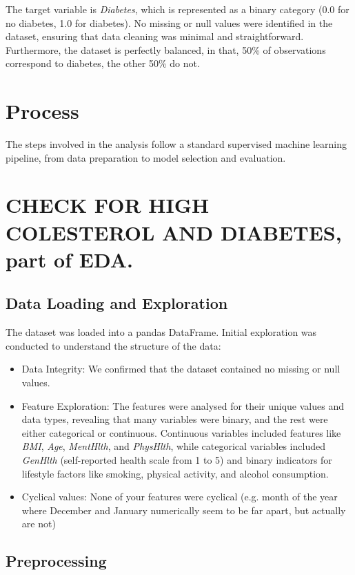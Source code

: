 \documentclass[a4paper,12pt]{article}
\begin{document}
The target variable is \textit{Diabetes}, which is represented as a binary category 
(0.0 for no diabetes, 1.0 for diabetes). No missing or null values were identified in the dataset, 
ensuring that data cleaning was minimal and straightforward. Furthermore, the dataset is perfectly 
balanced, in that, 50\% of observations correspond to diabetes, the other 50\% do not.


\section{Process}
The steps involved in the analysis follow a standard supervised machine learning pipeline, 
from data preparation to model selection and evaluation.

\section{CHECK FOR HIGH COLESTEROL AND DIABETES, part of EDA.}

\subsection{Data Loading and Exploration}
The dataset was loaded into a pandas DataFrame. Initial exploration was conducted to understand 
the structure of the data:
\begin{itemize}
    \item Data Integrity: We confirmed that the dataset contained no missing or null values.
    \item Feature Exploration: The features were analysed for their unique values and data 
    types, revealing that many variables were binary, and the rest were either categorical or 
    continuous. Continuous variables included features like \textit{BMI}, \textit{Age}, \textit{MentHlth}, 
    and \textit{PhysHlth}, while categorical variables included \textit{GenHlth} 
    (self-reported health scale from 1 to 5) and binary indicators for lifestyle factors like 
    smoking, physical activity, and alcohol consumption.
    \item Cyclical values: None of your features were cyclical (e.g. month of the year where December and 
    January numerically seem to be far apart, but actually are not)
\end{itemize}

\subsection{Preprocessing}
\end{document}
